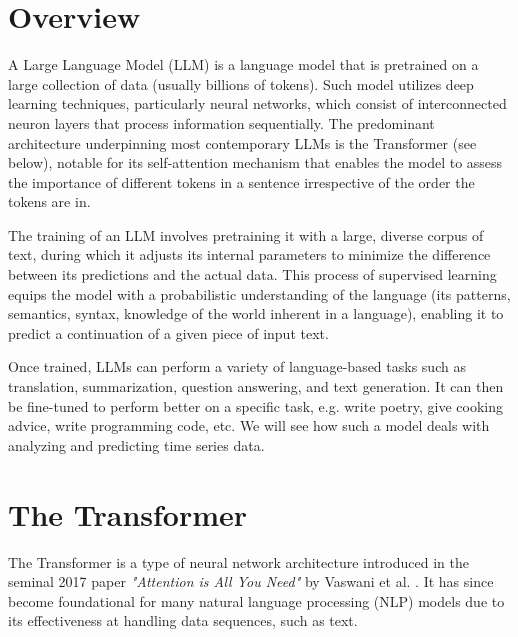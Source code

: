 \section{Overview}

A Large Language Model (LLM) \cite{llmintro} is a language model that is pretrained on a large collection of data (usually billions of tokens).
Such model utilizes deep learning techniques, particularly neural networks, which consist of interconnected neuron layers that process information sequentially.
The predominant architecture underpinning most contemporary LLMs is the Transformer (see below), notable for its self-attention mechanism that enables the model to assess the importance of different tokens in a sentence irrespective of the order the tokens are in.

The training of an LLM involves pretraining it with a large, diverse corpus of text, during which it adjusts its internal parameters to minimize the difference between its predictions and the actual data. This process of supervised learning equips the model with a probabilistic understanding of the language (its patterns, semantics, syntax, knowledge of the world inherent in a language), enabling it to predict a continuation of a given piece of input text.

Once trained, LLMs can perform a variety of language-based tasks such as translation, summarization, question answering, and text generation.
It can then be fine-tuned to perform better on a specific task, e.g. write poetry, give cooking advice, write programming code, etc.
We will see how such a model deals with analyzing and predicting time series data.


\section{The Transformer}

The Transformer is a type of neural network architecture introduced in the seminal 2017 paper \textit{"Attention is All You Need"} by Vaswani et al. \cite{attention_is_all_you_need}. It has since become foundational for many natural language processing (NLP) models due to its effectiveness at handling data sequences, such as text.


